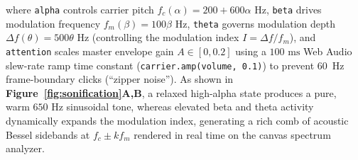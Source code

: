 \documentclass[10pt,twocolumn]{article}
\begin{document}
where \texttt{alpha} controls carrier pitch $f_c(\alpha) = 200 + 600\alpha\text{ Hz}$, \texttt{beta} drives modulation frequency $f_m(\beta) = 100\beta\text{ Hz}$, \texttt{theta} governs modulation depth $\Delta f(\theta) = 500\theta\text{ Hz}$ (controlling the modulation index $I = \Delta f / f_m$), and \texttt{attention} scales master envelope gain $A \in [0, 0.2]$ using a $100\text{ ms}$ Web Audio slew-rate ramp time constant (\texttt{carrier.amp(volume, 0.1)}) to prevent 60~Hz frame-boundary clicks (``zipper noise''). As shown in \textbf{Figure~\ref{fig:sonification}A,B}, a relaxed high-alpha state produces a pure, warm $650\text{ Hz}$ sinusoidal tone, whereas elevated beta and theta activity dynamically expands the modulation index, generating a rich comb of acoustic Bessel sidebands at $f_c \pm k f_m$ rendered in real time on the canvas spectrum analyzer.
\end{document}
